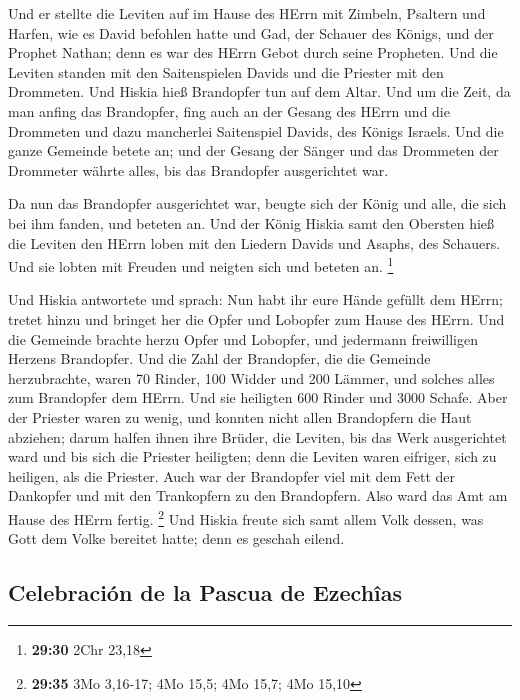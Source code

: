  Und er stellte die Leviten auf im Hause des HErrn mit
Zimbeln, Psaltern und Harfen, wie es David befohlen hatte und Gad, der
Schauer des Königs, und der Prophet Nathan; denn es war des HErrn Gebot
durch seine Propheten.  Und die Leviten standen mit den
Saitenspielen Davids und die Priester mit den Drommeten. 
Und Hiskia hieß Brandopfer tun auf dem Altar. Und um die Zeit, da man
anfing das Brandopfer, fing auch an der Gesang des HErrn und die
Drommeten und dazu mancherlei Saitenspiel Davids, des Königs Israels.
 Und die ganze Gemeinde betete an; und der Gesang der
Sänger und das Drommeten der Drommeter währte alles, bis das Brandopfer
ausgerichtet war.

 Da nun das Brandopfer ausgerichtet war, beugte sich der
König und alle, die sich bei ihm fanden, und beteten an. 
Und der König Hiskia samt den Obersten hieß die Leviten den HErrn loben
mit den Liedern Davids und Asaphs, des Schauers. Und sie lobten mit
Freuden und neigten sich und beteten an. \footnote{\textbf{29:30} 2Chr
  23,18}

 Und Hiskia antwortete und sprach: Nun habt ihr eure
Hände gefüllt dem HErrn; tretet hinzu und bringet her die Opfer und
Lobopfer zum Hause des HErrn. Und die Gemeinde brachte herzu Opfer und
Lobopfer, und jedermann freiwilligen Herzens Brandopfer. 
Und die Zahl der Brandopfer, die die Gemeinde herzubrachte, waren 70
Rinder, 100 Widder und 200 Lämmer, und solches alles zum Brandopfer dem
HErrn.  Und sie heiligten 600 Rinder und 3000 Schafe.
 Aber der Priester waren zu wenig, und konnten nicht
allen Brandopfern die Haut abziehen; darum halfen ihnen ihre Brüder, die
Leviten, bis das Werk ausgerichtet ward und bis sich die Priester
heiligten; denn die Leviten waren eifriger, sich zu heiligen, als die
Priester.  Auch war der Brandopfer viel mit dem Fett der
Dankopfer und mit den Trankopfern zu den Brandopfern. Also ward das Amt
am Hause des HErrn fertig. \footnote{\textbf{29:35} 3Mo 3,16-17; 4Mo
  15,5; 4Mo 15,7; 4Mo 15,10}  Und Hiskia freute sich samt
allem Volk dessen, was Gott dem Volke bereitet hatte; denn es geschah
eilend.

\hypertarget{celebraciuxf3n-de-la-pascua-de-ezechuxeeas}{%
\subsection{Celebración de la Pascua de
Ezechîas}\label{celebraciuxf3n-de-la-pascua-de-ezechuxeeas}}

